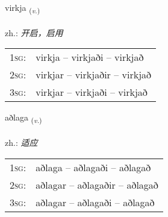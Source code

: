 \documentclass[frontgrid, backgrid]{flacards}\usepackage[]{graphicx}\usepackage[]{xcolor}
\begin{document}
\renewcommand{\blhead}{\vskip5pt {\small\bfseries\footnotesize Sagnorð | 动词 }}
\renewcommand{\bcfoot}{\vskip5pt \hspace{2pt}{\small\bfseries\footnotesize 3K}}


{virkja \small{\textsubscript{(\textit{v.})}} \\[1ex] %
\textphonetic{[vɪr̥ca]} \\
zh.: \emph{开启，启用} \\  [2ex]
\renewcommand*{\arraystretch}{0.8}
\begin{tabular}{p{1cm}l}
\textsc{1sg}: & virkja -- virkjaði -- virkjað \\ 
\textsc{2sg}: & virkjar -- virkjaðir -- virkjað \\ 
\textsc{3sg}: & virkjar -- virkjaði -- virkjað \\ 
\end{tabular}
}

\renewcommand{\flhead}{\vskip5pt \fboxsep=0pt {\small\bfseries\footnotesize Sagnorð | 动词}}
\renewcommand{\fcfoot}{\vskip5pt \fboxsep=0pt \hspace{2pt}{\small\bfseries\footnotesize 3K}}

\renewcommand{\blhead}{\vskip5pt {\small\bfseries\footnotesize Sagnorð | 动词 }}
\renewcommand{\bcfoot}{\vskip5pt \hspace{2pt}{\small\bfseries\footnotesize 3K}}


{aðlaga \small{\textsubscript{(\textit{v.})}} \\[1ex] %
\textphonetic{[aðlaɣa]} \\
zh.: \emph{适应} \\  [2ex]
\renewcommand*{\arraystretch}{0.8}
\begin{tabular}{p{1cm}l}
\textsc{1sg}: & aðlaga -- aðlagaði -- aðlagað \\ 
\textsc{2sg}: & aðlagar -- aðlagaðir -- aðlagað \\ 
\textsc{3sg}: & aðlagar -- aðlagaði -- aðlagað \\ 
\end{tabular}
}
\end{document}
